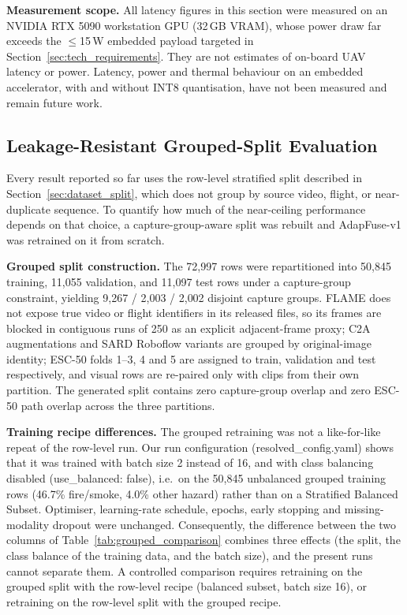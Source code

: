 \documentclass[journal]{IEEEtran}
\begin{document}
\textbf{Measurement scope.} All latency figures in this section were measured on an NVIDIA RTX 5090 workstation GPU (32\,GB VRAM), whose power draw far exceeds the $\leq$15\,W embedded payload targeted in Section~\ref{sec:tech_requirements}. They are not estimates of on-board UAV latency or power. Latency, power and thermal behaviour on an embedded accelerator, with and without INT8 quantisation, have not been measured and remain future work.

\subsection{Leakage-Resistant Grouped-Split Evaluation}
\label{sec:grouped_split}

Every result reported so far uses the row-level stratified split described in Section~\ref{sec:dataset_split}, which does not group by source video, flight, or near-duplicate sequence. To quantify how much of the near-ceiling performance depends on that choice, a capture-group-aware split was rebuilt and AdapFuse-v1 was retrained on it from scratch.

\textbf{Grouped split construction.} The 72{,}997 rows were repartitioned into 50{,}845 training, 11{,}055 validation, and 11{,}097 test rows under a capture-group constraint, yielding 9{,}267 / 2{,}003 / 2{,}002 disjoint capture groups. FLAME does not expose true video or flight identifiers in its released files, so its frames are blocked in contiguous runs of 250 as an explicit adjacent-frame proxy; C2A augmentations and SARD Roboflow variants are grouped by original-image identity; ESC-50 folds 1--3, 4 and 5 are assigned to train, validation and test respectively, and visual rows are re-paired only with clips from their own partition. The generated split contains zero capture-group overlap and zero ESC-50 path overlap across the three partitions.

\textbf{Training recipe differences.} The grouped retraining was not a like-for-like repeat of the row-level run. Our run configuration (resolved\_config.yaml) shows that it was trained with batch size 2 instead of 16, and with class balancing disabled (use\_balanced: false), i.e.\ on the 50{,}845 unbalanced grouped training rows (46.7\% fire/smoke, 4.0\% other hazard) rather than on a Stratified Balanced Subset. Optimiser, learning-rate schedule, epochs, early stopping and missing-modality dropout were unchanged. Consequently, the difference between the two columns of Table~\ref{tab:grouped_comparison} combines three effects (the split, the class balance of the training data, and the batch size), and the present runs cannot separate them. A controlled comparison requires retraining on the grouped split with the row-level recipe (balanced subset, batch size 16), or retraining on the row-level split with the grouped recipe.
\end{document}
